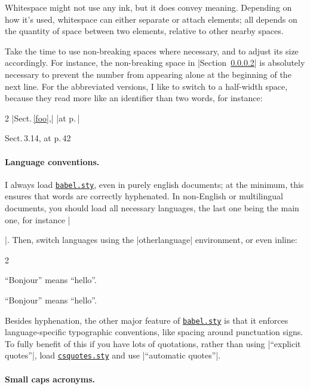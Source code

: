 \documentclass[a4paper,twoside,nofonts]{tufte-handout}
\makeatletter
\newcommand\code[1]{\texttt{#1}}
\let\file\code
\def\resultstyle{%
  \def\rmdefault{cmr}%
  \def\ttdefault{cmtt}%
  \def\sfdefault{cmss}%
  \let\familydefault\rmdefault
  \normalfont}
\newcommand\result[1]{{\resultstyle #1}}
\newenvironment{longresult}{\resultstyle\small}{\par}
\newenvironment{comparing}{%
  \begin{multicols}{2}%
  \small
  \parindent 0pt%
  \def\comparewith{\par\columnbreak}%
}{\end{multicols}}
\def\ctan@prefix{http://ctan.tug.org/pkg/}
\newcommand\package[2][\@empty]{%
  \href{\ctan@prefix #2}{\file{\ifx #1\@empty #2.sty\else #1\fi}}}
\makeatother
\begin{document}
Whitespace might not use any ink, but it does convey meaning.
Depending on how it's used, whitespace can either separate or attach elements; all depends on the quantity of space between two elements, relative to other nearby spaces.

Take the time to use non-breaking spaces where necessary, and to adjust its size accordingly.
For instance, the non-breaking space in |Section~\ref{}| is absolutely necessary to prevent the number from appearing alone at the beginning of the next line.
For the abbreviated versions, I like to switch to a half-width space, because they read more like an identifier than two words, for instance:
\begin{comparing}\obeylines
  |Sect.\,\ref{foo},|
  |at p.\,\pageref{foo}|
  \comparewith
  \result{Sect.\,3.14,}
  \result{at p.\,42}
\end{comparing}

\paragraph{Language conventions.}

I always load \package{babel}, even in purely english documents; at the minimum, this ensures that words are correctly hyphenated.
In non-English or multilingual documents, you should load all necessary languages, the last one being the main one, for instance |\usepackage[french,english]{babel}|.
Then, switch languages using the |otherlanguage| environment, or even inline:
\begin{comparing}
  \begin{latexcode}[gobble=4]
    \foreignlanguage{french}{%
      \enquote{Bonjour}}
    means \enquote{hello}.
  \end{latexcode}
  \comparewith
  \begin{longresult}
    \foreignlanguage{french}{\enquote{Bonjour}} means \enquote{hello}.
  \end{longresult}
\end{comparing}
Besides hyphenation, the other major feature of \package{babel} is that it enforces language-specific typographic conventions, like spacing around punctuation signs.
To fully benefit of this if you have lots of quotations, rather than using |``explicit quotes''|, load \package{csquotes} and use |\enquote{automatic quotes}|.

\paragraph{Small caps acronyms.}
\end{document}
